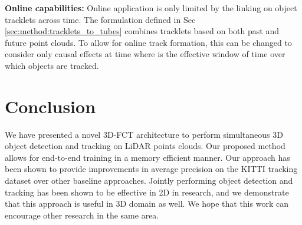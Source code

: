 \documentclass[10pt,twocolumn,letterpaper]{article}
\begin{document}
\textbf{Online capabilities:} Online application is only limited by the linking on object tracklets across time. The formulation defined in Sec \ref{sec:method:tracklets_to_tubes} combines tracklets based on both past and future point clouds. To allow for online track formation, this can be changed to consider only causal effects at time  where  is the effective window of time over which objects are tracked.

\section{Conclusion}\label{sec:conclusion}
We have presented a novel 3D-FCT architecture to perform simultaneous 3D object detection and tracking on LiDAR points clouds. Our proposed method allows for end-to-end training in a memory efficient manner. Our approach has been shown to provide improvements in average precision on the KITTI tracking dataset over other baseline approaches. Jointly performing object detection and tracking has been shown to be effective in 2D in research, and we demonstrate that this approach is useful in 3D domain as well. We hope that this work can encourage other research in the same area.




{\small


}
\end{document}
